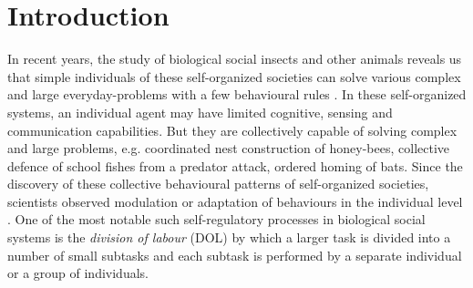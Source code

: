 \documentclass{intech}
\affiliation{University of Wales, Newport}
\begin{document}
\maketitle

\begin{acronym}
\end{acronym}

\section{Introduction}
In recent years, the study of biological social insects and other animals reveals us that simple individuals of these self-organized  societies can solve various complex and large everyday-problems with a few behavioural rules \citep{Camazine+2001}. In these self-organized systems, an individual agent may have limited cognitive, sensing and communication capabilities. But they are collectively capable of solving complex and large problems, e.g. coordinated nest construction of honey-bees, collective defence of school fishes from a predator attack, ordered homing of bats.  Since the discovery of these collective behavioural patterns of self-organized societies, scientists observed modulation or adaptation of behaviours in the individual level \citep{Garnier+2007}. One of the most notable such self-regulatory processes in biological social systems is the \textit{division of labour} (DOL) \citep{Sendova-Franks+1999} by which a larger task is divided into a number of small subtasks and each subtask is performed by a separate individual or a group of individuals. 
\end{document}
